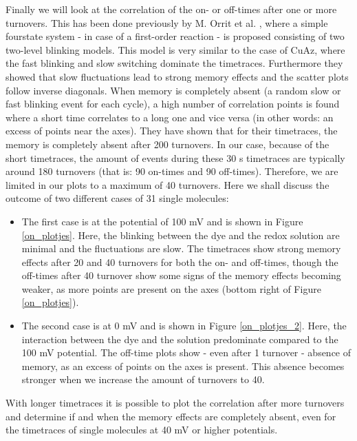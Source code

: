 \documentclass[twoside,single]{lion-msc}
\begin{document}
Finally we will look at the correlation of the on- or off-times after one or more turnovers. This has been done previously by M. Orrit et al. \cite{Lippitz2005}, where a simple fourstate system - in case of a first-order reaction - is proposed consisting of two two-level blinking models. This model is very similar to the case of CuAz, where the fast blinking and slow switching dominate the timetraces. Furthermore they showed that slow fluctuations lead to strong memory effects and the scatter plots follow inverse diagonals. When memory is completely absent (a random slow or fast blinking event for each cycle), a high number of correlation points is found where a short time correlates to a long one and vice versa (in other words: an excess of points near the axes). They have shown that for their timetraces, the memory is completely absent after 200 turnovers.
In our case, because of the short timetraces, the amount of events during these 30 s timetraces are typically around 180 turnovers (that is: 90 on-times and 90 off-times). Therefore, we are limited in our plots to a maximum of 40 turnovers. Here we shall discuss the outcome of two different cases of 31 single molecules:
\begin{itemize}
\item  The first case is at the potential of 100 mV and is shown in Figure \ref{on_plotjes}. Here, the blinking between the dye and the redox solution are minimal and the fluctuations are slow. The timetraces show strong memory effects after 20 and 40 turnovers for both the on- and off-times, though the off-times after 40 turnover show some signs of the memory effects becoming weaker, as more points are present on the axes (bottom right of Figure \ref{on_plotjes}). 
\item The second case is at 0 mV and is shown in Figure \ref{on_plotjes_2}. Here, the interaction between the dye and the solution predominate compared to the 100 mV potential. The off-time plots show - even after 1 turnover - absence of memory, as an excess of points on the axes is present. This absence becomes stronger when we increase the amount of turnovers to 40. 
\end{itemize}
With longer timetraces it is possible to plot the correlation after more turnovers and determine if and when the memory effects are completely absent, even for the timetraces of single molecules at 40 mV or higher potentials.


\newpage
\end{document}

